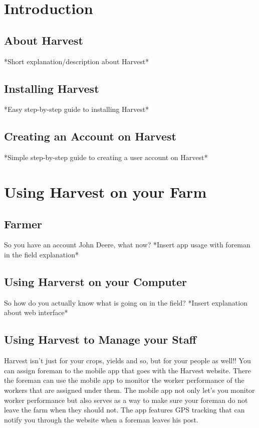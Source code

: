 \documentclass[11pt,fleqn]{book} %
\begin{document}

\chapter{Introduction}
	\section{About Harvest}
		*Short explanation/description about Harvest*
	\section{Installing Harvest}
		*Easy step-by-step guide to installing Harvest*
	\section{Creating an Account on Harvest}
		*Simple step-by-step guide to creating a user account on Harvest*


\chapter{Using Harvest on your Farm}
	\section{Farmer}
		So you have an account John Deere, what now? *Insert app usage with foreman in the field explanation*
	\section{Using Harverst on your Computer}
		So how do you actually know what is going on in the field? *Insert explanation about web interface*
	\section{Using Harvest to Manage your Staff}
		Harvest isn't just for your crops, yields and so, but for your people as well!! You can assign foreman to the mobile app that goes with the Harvest website. There the foreman can use the mobile app to monitor the worker performance of the workers that are assigned under them. The mobile app not only let's you monitor worker performance but also serves as a way to make sure your foreman do not leave the farm when they should not. The app features GPS tracking that can notify you through the website when a foreman leaves his post.
		
\end{document}

